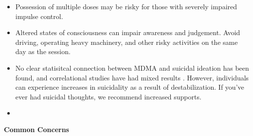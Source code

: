 \documentclass[12pt,letterpaper]{article}
\begin{document}
\begin{itemize}
    \item Possession of multiple doses may be risky for those with severely impaired impulse control.
    \item Altered states of consciousness can impair awareness and judgement. Avoid driving, operating heavy machinery, and other risky activities on the same day as the session.
    \item No clear statisitcal connection between MDMA and suicidal ideation has been found, and correlational studies have had mixed results \cite{jonesSuicideAdults,jonesSuicideAdolescents,kimSuicide}. However, individuals can experience increases in suicidality as a result of destabilization. If you've ever had suicidal thoughts, we recommend increased supports. 
    \item {}
\end{itemize}
\noindent \textbf{Common Concerns}
\end{document}
